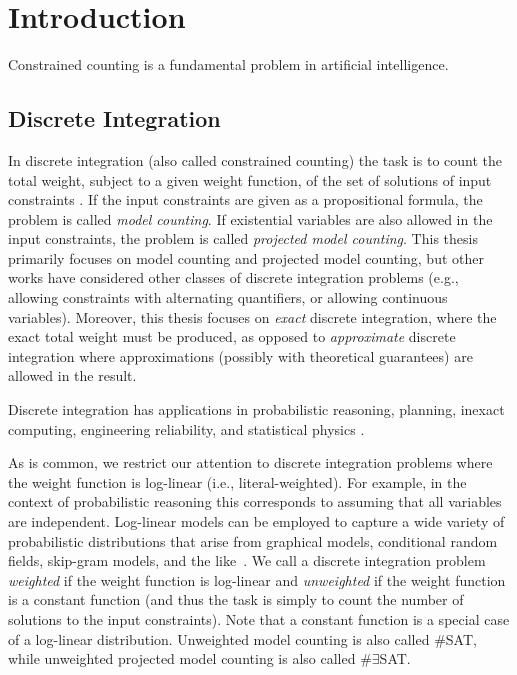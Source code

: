 \chapter{Introduction}
\label{ch:intro}
Constrained counting is a fundamental problem in artificial intelligence.

\section{Discrete Integration}
In discrete integration (also called constrained counting) the task is to count the total weight, subject to a given weight function, of the set of solutions of input constraints \cite{GSS08}. 
If the input constraints are given as a propositional formula, the problem is called \emph{model counting}. 
If existential variables are also allowed in the input constraints, the problem is called \emph{projected model counting}. This thesis primarily focuses on model counting and projected model counting, but other works have considered other classes of discrete integration problems (e.g., allowing constraints with alternating quantifiers, or allowing continuous variables). %
Moreover, this thesis focuses on \emph{exact} discrete integration, where the exact total weight must be produced, as opposed to \emph{approximate} discrete integration where approximations (possibly with theoretical guarantees) are allowed in the result. %

Discrete integration has applications in probabilistic reasoning, planning, inexact computing, engineering reliability, and statistical physics \cite{Bacchus2003,DH07,GSS08,naveh2007constraint}.

As is common, we restrict our attention to discrete integration problems where the weight function is log-linear (i.e., literal-weighted).
For example, in the context of probabilistic reasoning this corresponds to assuming that all variables are independent.
Log-linear models can be employed to capture a wide variety of probabilistic distributions that arise from graphical models, conditional random fields, skip-gram models, and the like~\cite{KF09}. %
We call a discrete integration problem \emph{weighted} if the weight function is log-linear and \emph{unweighted} if the weight function is a constant function (and thus the task is simply to count the number of solutions to the input constraints).
Note that a constant function is a special case of a log-linear distribution.
Unweighted model counting is also called \#SAT, while unweighted projected model counting is also called $\#\exists$SAT.

